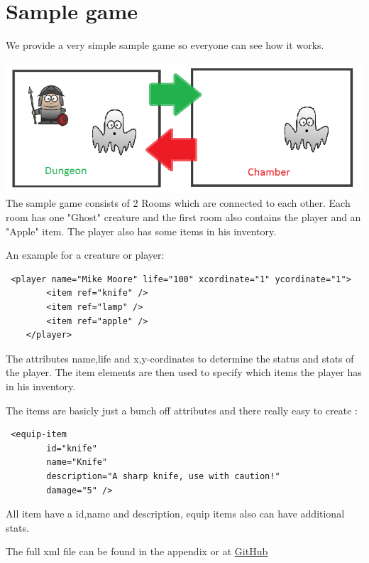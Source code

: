 \chapter{Sample game}

We provide a very simple sample game so everyone can see how it works. 

\includegraphics*{../assets/SampleGame.png}
 The sample game consists of 2 Rooms which are connected to each other. Each room has one "Ghost" creature and the first room also contains the player and an "Apple" item.  The player also has some items in his inventory.
 
 An example for a creature or player:
 \begin{verbatim}
 <player name="Mike Moore" life="100" xcordinate="1" ycordinate="1">
        <item ref="knife" />
        <item ref="lamp" />
        <item ref="apple" />
    </player>
 \end{verbatim}
 The  attributes name,life and x,y-cordinates to determine the status and stats of the player.
 The item elements are then used to specify which items the player has in his inventory.
 
 The items are basicly just a bunch off attributes and there really easy to create :
 \begin{verbatim}
 <equip-item
        id="knife"
        name="Knife"
        description="A sharp knife, use with caution!"
        damage="5" />
 \end{verbatim}
All item have a id,name and description, equip items also can have additional stats.

The full xml file can be found in the appendix or at \href{https://github.com/kerko/epic/blob/dev/project/demo/demo.xml}{GitHub}